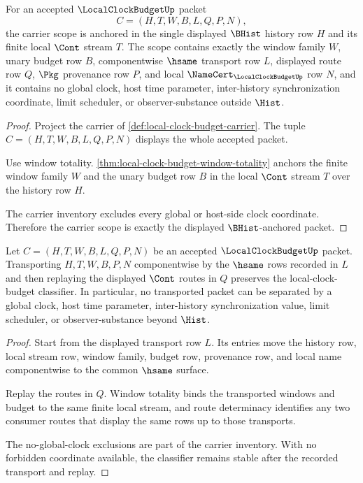 \begin{theorem}
\label{thm:local-clock-budget-carrier-scope}
For an accepted $\LocalClockBudgetUp$ packet
$$
C=(H,T,W,B,L,Q,P,N),
$$
the carrier scope is anchored in the single displayed $\BHist$ history row $H$ and its finite local $\Cont$ stream $T$. The scope contains exactly the window family $W$, unary budget row $B$, componentwise $\hsame$ transport row $L$, displayed route row $Q$, $\Pkg$ provenance row $P$, and local $\NameCert_{\LocalClockBudgetUp}$ row $N$, and it contains no global clock, host time parameter, inter-history synchronization coordinate, limit scheduler, or observer-substance outside $\Hist$.
\end{theorem}
\begin{proof}
Project the carrier of \autoref{def:local-clock-budget-carrier}. The tuple $C=(H,T,W,B,L,Q,P,N)$ displays the whole accepted packet.

Use window totality. \autoref{thm:local-clock-budget-window-totality} anchors the finite window family $W$ and the unary budget row $B$ in the local $\Cont$ stream $T$ over the history row $H$.

The carrier inventory excludes every global or host-side clock coordinate. Therefore the carrier scope is exactly the displayed $\BHist$-anchored packet.
\end{proof}

\begin{theorem}
\label{thm:local-clock-budget-classifier-stability}
Let $C=(H,T,W,B,L,Q,P,N)$ be an accepted $\LocalClockBudgetUp$ packet. Transporting $H,T,W,B,P,N$ componentwise by the $\hsame$ rows recorded in $L$ and then replaying the displayed $\Cont$ routes in $Q$ preserves the local-clock-budget classifier. In particular, no transported packet can be separated by a global clock, host time parameter, inter-history synchronization value, limit scheduler, or observer-substance beyond $\Hist$.
\end{theorem}
\begin{proof}
Start from the displayed transport row $L$. Its entries move the history row, local stream row, window family, budget row, provenance row, and local name componentwise to the common $\hsame$ surface.

Replay the routes in $Q$. Window totality binds the transported windows and budget to the same finite local stream, and route determinacy identifies any two consumer routes that display the same rows up to those transports.

The no-global-clock exclusions are part of the carrier inventory. With no forbidden coordinate available, the classifier remains stable after the recorded transport and replay.
\end{proof}

